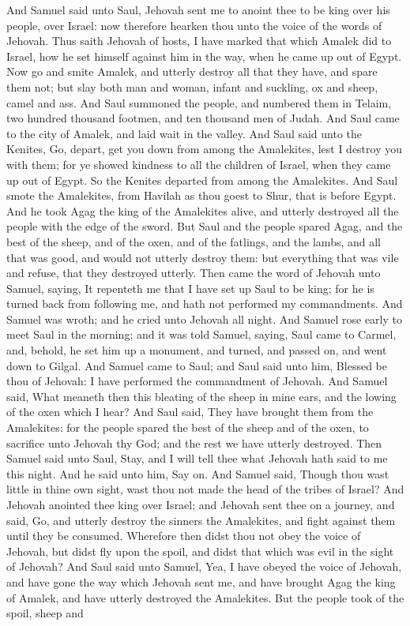 And Samuel said unto Saul, Jehovah sent me to anoint thee to be king over his people, over Israel: now therefore hearken thou unto the voice of the words of Jehovah. Thus saith Jehovah of hosts, I have marked that which Amalek did to Israel, how he set himself against him in the way, when he came up out of Egypt. Now go and smite Amalek, and utterly destroy all that they have, and spare them not; but slay both man and woman, infant and suckling, ox and sheep, camel and ass.  And Saul summoned the people, and numbered them in Telaim, two hundred thousand footmen, and ten thousand men of Judah. And Saul came to the city of Amalek, and laid wait in the valley. And Saul said unto the Kenites, Go, depart, get you down from among the Amalekites, lest I destroy you with them; for ye showed kindness to all the children of Israel, when they came up out of Egypt. So the Kenites departed from among the Amalekites. And Saul smote the Amalekites, from Havilah as thou goest to Shur, that is before Egypt. And he took Agag the king of the Amalekites alive, and utterly destroyed all the people with the edge of the sword. But Saul and the people spared Agag, and the best of the sheep, and of the oxen, and of the fatlings, and the lambs, and all that was good, and would not utterly destroy them: but everything that was vile and refuse, that they destroyed utterly.  Then came the word of Jehovah unto Samuel, saying, It repenteth me that I have set up Saul to be king; for he is turned back from following me, and hath not performed my commandments. And Samuel was wroth; and he cried unto Jehovah all night. And Samuel rose early to meet Saul in the morning; and it was told Samuel, saying, Saul came to Carmel, and, behold, he set him up a monument, and turned, and passed on, and went down to Gilgal. And Samuel came to Saul; and Saul said unto him, Blessed be thou of Jehovah: I have performed the commandment of Jehovah. And Samuel said, What meaneth then this bleating of the sheep in mine ears, and the lowing of the oxen which I hear? And Saul said, They have brought them from the Amalekites: for the people spared the best of the sheep and of the oxen, to sacrifice unto Jehovah thy God; and the rest we have utterly destroyed. Then Samuel said unto Saul, Stay, and I will tell thee what Jehovah hath said to me this night. And he said unto him, Say on.  And Samuel said, Though thou wast little in thine own sight, wast thou not made the head of the tribes of Israel? And Jehovah anointed thee king over Israel; and Jehovah sent thee on a journey, and said, Go, and utterly destroy the sinners the Amalekites, and fight against them until they be consumed. Wherefore then didst thou not obey the voice of Jehovah, but didst fly upon the spoil, and didst that which was evil in the sight of Jehovah? And Saul said unto Samuel, Yea, I have obeyed the voice of Jehovah, and have gone the way which Jehovah sent me, and have brought Agag the king of Amalek, and have utterly destroyed the Amalekites. But the people took of the spoil, sheep and 